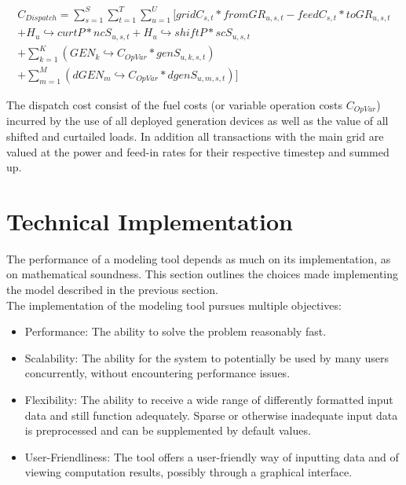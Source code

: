 \documentclass[
	11pt,								%
	DIV10,								%
	a4paper,         					%
	oneside,							%
	headheight=20pt,					%
	footheight=20pt,					%
    parskip=full,						%
    listof=totoc,						%
	bibliography=totoc,					%
	index=totoc,						%
]{scrartcl}
\begin{document}
\begin{equation}
	\begin{split}
		C_{Dispatch} = \sum_{s=1}^{S}\sum_{t=1}^{T}\sum_{u=1}^{U}[gridC_{s,t} * fromGR_{u,s,t} - feedC_{s,t} * toGR_{u,s,t}\\
		+ H_u\hookrightarrow  curtP * ncS_{u,s,t} + H_u\hookrightarrow  shiftP * scS_{u,s,t}\\
		+ \sum_{k=1}^K(GEN_k\hookrightarrow  C_{OpVar} * genS_{u,k,s,t})\\ 
		+ \sum_{m=1}^M(dGEN_m\hookrightarrow  C_{OpVar} * dgenS_{u,m,s,t})]
	\end{split}
\end{equation}

The dispatch cost consist of the fuel costs (or variable operation costs $C_{OpVar}$) incurred by the use of all deployed generation devices as well as the value of all shifted and curtailed loads. In addition all transactions with the main grid are valued at the power and feed-in rates for their respective timestep and summed up.



\newpage
{}	
\section{Technical Implementation}
The performance of a modeling tool depends as much on its implementation, as on mathematical soundness. This section outlines the choices made implementing the model described in the previous section.\\
The implementation of the modeling tool pursues multiple objectives:
\begin{itemize}
	\item Performance: The ability to solve the problem reasonably fast.
	\item Scalability: The ability for the system to potentially be used by many users concurrently, without encountering performance issues.
	\item Flexibility: The ability to receive a wide range of differently formatted input data and still function adequately. Sparse or otherwise inadequate input data is preprocessed and can be supplemented by default values.
	\item User-Friendliness: The tool offers a user-friendly way of inputting data and of viewing computation results, possibly through a graphical interface.
\end{itemize}
\end{document}
